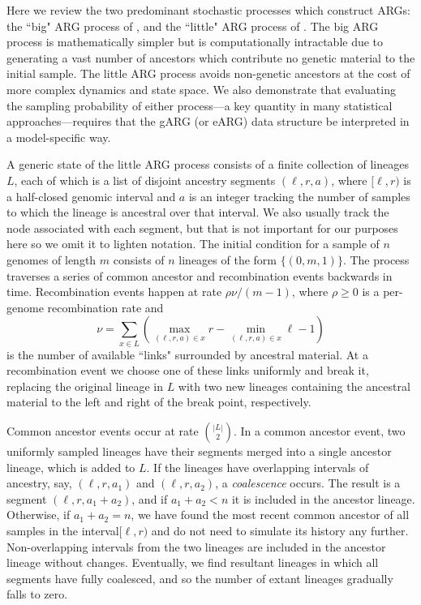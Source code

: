 \documentclass{article}
\begin{document}
Here we review the two predominant stochastic processes which construct ARGs:
the ``big" ARG process of \cite{griffiths1997ancestral}, and the ``little" ARG process of
 \cite{hudson1983properties}. The big ARG process is mathematically simpler
 but is computationally intractable due to generating a vast number of ancestors
 which contribute no genetic material to the initial sample.
The little ARG process avoids non-genetic ancestors at the cost of more complex
dynamics and state space. We also demonstrate that evaluating the sampling probability
of either process---a key quantity in many statistical approaches---requires that the
gARG (or eARG) data structure be interpreted in a model-specific way.

A generic state of the little ARG process consists of a finite collection of lineages $L$,
each of which is a list of disjoint ancestry segments $(\ell, r, a)$, where
$[\ell, r)$ is a half-closed genomic interval and $a$ is an integer
tracking the number of samples to which the lineage is ancestral over that interval.
We also usually track the node associated with each segment, but
that is not important for our purposes here so we omit it to lighten notation.
The initial condition for a sample of $n$ genomes of length $m$ consists of $n$ lineages
of the form $\{(0, m, 1)\}$. The process traverses a series of common ancestor and
recombination events backwards in time.
Recombination events happen at rate $\rho \nu / (m - 1)$,
where $\rho \geq 0$ is a per-genome recombination rate and
 \[
 \nu = \sum_{x \in L}\left( \max_{(\ell, r, a) \in x}r
     - \min_{(\ell, r, a) \in x}\ell - 1 \right)
 \]
 is the number of available ``links" surrounded by ancestral material.
 At a recombination event we choose one of these links uniformly and break it,
 replacing the original lineage in $L$ with two new lineages containing the ancestral material
 to the left and right of the break point, respectively.

Common ancestor events occur at rate $\binom{|L|}{2}$.
In a common ancestor event, two uniformly sampled lineages have their segments
merged into a single ancestor lineage, which is added to $L$.
If the lineages have overlapping intervals of ancestry,
say, $(\ell, r, a_1)$ and $(\ell, r, a_2)$, a
\emph{coalescence} occurs. The result is a segment
$(\ell, r, a_1 + a_2)$, and if $a_1 + a_2 < n$ it is included in the
ancestor lineage. Otherwise, if $a_1 + a_2 = n$, we have found
the most recent common ancestor of all samples in the interval$[\ell, r)$
and do not need to simulate its history any further.
Non-overlapping intervals from the two lineages are included
 in the ancestor lineage without changes. Eventually,
we find resultant lineages in which all segments have fully coalesced,
and so the number of extant lineages gradually falls to zero.
\end{document}
